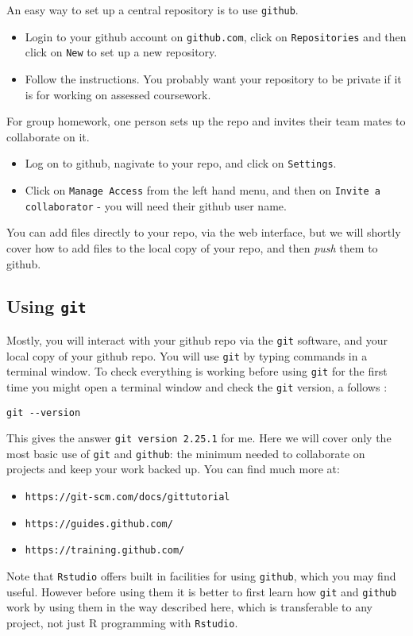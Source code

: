 \documentclass[10pt] {article}
\theoremstyle{definition}
\begin{document}
An easy way to set up a central repository is to use {\tt github}.  
\begin{itemize}
\item Login to your github account on {\tt github.com}, click on {\tt Repositories} and then click on {\tt New} to set up a new repository.
\item Follow the instructions. You probably want your repository to be private if it is for working on assessed coursework.
\end{itemize}
For group homework, one person sets up the repo and invites their team mates to collaborate on it. 
\begin{itemize}
\item Log on to github, nagivate to your repo, and click on {\tt Settings}.
\item Click on {\tt Manage Access} from the left hand menu, and then on {\tt Invite a collaborator} - you will need their github user name. 
\end{itemize}
You can add files directly to your repo, via the web interface, but we will shortly cover how to add files to the local copy of your repo, and then {\em push} them to github. 

\subsection{Using {\tt git}}

Mostly, you will interact with your github repo via the {\tt git} software, and your local copy of your github repo. You will use {\tt git} by typing commands in a terminal window. To check everything is working before using {\tt git} for the first time you might open a terminal window and check the {\tt git} version, a follows :
\begin{verbatim}
git --version
\end{verbatim}
This gives the answer \verb+git version 2.25.1+ for me. Here we will cover only the most basic use of {\tt git} and {\tt github}: the minimum needed to collaborate on projects and keep your work backed up. You can find much more at:
\begin{itemize}
\item \verb+https://git-scm.com/docs/gittutorial+
\item \verb+https://guides.github.com/+
\item \verb+https://training.github.com/+
\end{itemize}
Note that {\tt Rstudio} offers built in facilities for using {\tt github}, which you may find useful. However before using them it is better to first learn how {\tt git} and {\tt github} work by using them in the way described here, which is transferable to any project, not just R programming with {\tt Rstudio}.  
\end{document}
